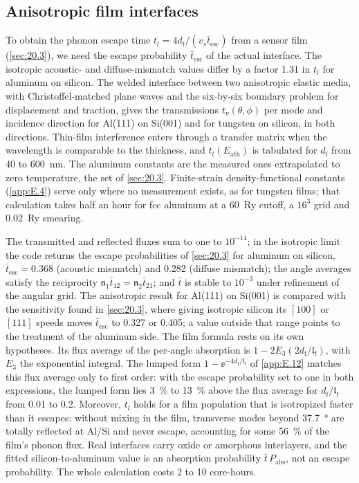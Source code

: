 \subsection{Anisotropic film interfaces}

To obtain the phonon escape time $t_l = 4d_{\mathrm{f}}/(v_s\bar t_{\mathrm{esc}})$ from a sensor film (\cref{sec:20.3}), we need the escape probability $\bar t_{\mathrm{esc}}$ of the actual interface. The isotropic acoustic- and diffuse-mismatch values differ by a factor 1.31 in $t_l$ for aluminum on silicon. The welded interface between two anisotropic elastic media, with Christoffel-matched plane waves and the six-by-six boundary problem for displacement and traction, gives the transmissions $t_\nu(\theta, \phi)$ per mode and incidence direction for Al(111) on Si(001) and for tungsten on silicon, in both directions. Thin-film interference enters through a transfer matrix when the wavelength is comparable to the thickness, and $t_l(E_{\mathrm{ath}})$ is tabulated for $d_{\mathrm{f}}$ from 40 to \SI{600}{nm}. The aluminum constants are the measured ones extrapolated to zero temperature, the set of \cref{sec:20.3}. Finite-strain density-functional constants (\cref{app:E.4}) serve only where no measurement exists, as for tungsten films; that calculation takes half an hour for fcc aluminum at a \SI{60}{Ry} cutoff, a $16^3$ grid and \SI{0.02}{Ry} smearing.

The transmitted and reflected fluxes sum to one to $10^{-14}$; in the isotropic limit the code returns the escape probabilities of \cref{sec:20.3} for aluminum on silicon, $\bar t_{\mathrm{esc}} = 0.368$ (acoustic mismatch) and 0.282 (diffuse mismatch); the angle averages satisfy the reciprocity $\mathfrak{n}_1\bar t_{12} = \mathfrak{n}_2\bar t_{21}$; and $\bar t$ is stable to $10^{-3}$ under refinement of the angular grid. The anisotropic result for Al(111) on Si(001) is compared with the sensitivity found in \cref{sec:20.3}, where giving isotropic silicon its $[100]$ or $[111]$ speeds moves $\bar t_{\mathrm{esc}}$ to 0.327 or 0.405; a value outside that range points to the treatment of the aluminum side. The film formula rests on its own hypotheses. Its flux average of the per-angle absorption is $1 - 2E_3(2d_{\mathrm{f}}/\mathfrak{l}_{\mathrm{f}})$, with $E_3$ the exponential integral. The lumped form $1 - \ee^{-4d_{\mathrm{f}}/\mathfrak{l}_{\mathrm{f}}}$ of \cref{app:E.12} matches this flux average only to first order: with the escape probability set to one in both expressions, the lumped form lies \SI{3}{\percent} to \SI{13}{\percent} above the flux average for $d_{\mathrm{f}}/\mathfrak{l}_{\mathrm{f}}$ from 0.01 to 0.2. Moreover, $t_l$ holds for a film population that is isotropized faster than it escapes: without mixing in the film, transverse modes beyond \SI{37.7}{\degree} are totally reflected at Al/Si and never escape, accounting for some \SI{56}{\percent} of the film's phonon flux. Real interfaces carry oxide or amorphous interlayers, and the fitted silicon-to-aluminum value is an absorption probability $\bar t\,P_{\mathrm{abs}}$, not an escape probability. The whole calculation costs 2 to 10 core-hours.

